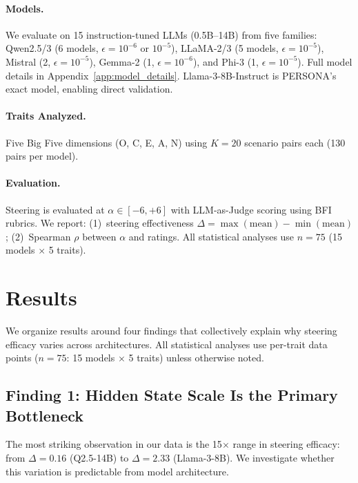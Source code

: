 \documentclass{article}
\begin{document}
\paragraph{Models.} We evaluate on 15 instruction-tuned LLMs (0.5B--14B) from five families: Qwen2.5/3 (6 models, $\epsilon{=}10^{-6}$ or $10^{-5}$), LLaMA-2/3 (5 models, $\epsilon{=}10^{-5}$), Mistral (2, $\epsilon{=}10^{-5}$), Gemma-2 (1, $\epsilon{=}10^{-6}$), and Phi-3 (1, $\epsilon{=}10^{-5}$). Full model details in Appendix~\ref{app:model_details}. Llama-3-8B-Instruct is PERSONA's exact model, enabling direct validation.

\paragraph{Traits Analyzed.} Five Big Five dimensions (O, C, E, A, N) using $K{=}20$ scenario pairs each (130 pairs per model).

\paragraph{Evaluation.} Steering is evaluated at $\alpha \in [-6, +6]$ with LLM-as-Judge scoring using BFI rubrics. We report: (1)~steering effectiveness $\Delta = \max(\text{mean}) - \min(\text{mean})$; (2)~Spearman $\rho$ between $\alpha$ and ratings. All statistical analyses use $n{=}75$ (15 models $\times$ 5 traits).

\section{Results}\label{sec:results}

We organize results around four findings that collectively explain why steering efficacy varies across architectures. All statistical analyses use per-trait data points ($n{=}75$: 15 models $\times$ 5 traits) unless otherwise noted.

\subsection{Finding 1: Hidden State Scale Is the Primary Bottleneck}\label{sec:arch_finding}

The most striking observation in our data is the 15$\times$ range in steering efficacy: from $\Delta{=}0.16$ (Q2.5-14B) to $\Delta{=}2.33$ (Llama-3-8B). We investigate whether this variation is predictable from model architecture.
\end{document}
